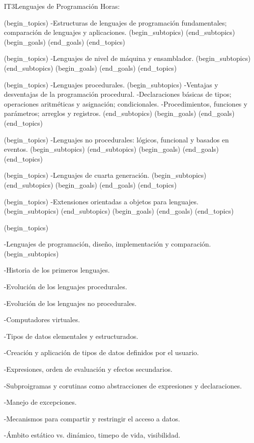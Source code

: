 \begin{BKL2}{IT3}{Lenguajes de Programación}
Horas:
 
(begin_topics)
-Estructuras de lenguajes de programación fundamentales; comparación de lenguajes y aplicaciones.
(begin_subtopics)
(end_subtopics)
(begin_goals)
(end_goals)
(end_topics)

 
(begin_topics)
-Lenguajes de nivel de máquina y ensamblador.
(begin_subtopics)
(end_subtopics)
(begin_goals)
(end_goals)
(end_topics)

 
(begin_topics)
-Lenguajes procedurales.
(begin_subtopics)
-Ventajas y desventajas de la programación procedural.
-Declaraciones básicas de tipos; operaciones aritméticas y asignación; condicionales.
-Procedimientos, funciones y parámetros; arreglos y registros.
(end_subtopics)
(begin_goals)
(end_goals)
(end_topics)

 
(begin_topics)
-Lenguajes no procedurales: lógicos, funcional y basados en eventos.
(begin_subtopics)
(end_subtopics)
(begin_goals)
(end_goals)
(end_topics)

 
(begin_topics)
-Lenguajes de cuarta generación.
(begin_subtopics)
(end_subtopics)
(begin_goals)
(end_goals)
(end_topics)

 

(begin_topics)
-Extensiones orientadas a objetos para lenguajes.
(begin_subtopics)
(end_subtopics)
(begin_goals)
(end_goals)
(end_topics)

 

(begin_topics)

-Lenguajes de programación, diseño, implementación y comparación.
(begin_subtopics)

-Historia de los primeros lenguajes.

-Evolución de los lenguajes procedurales.

-Evolución de los lenguajes no procedurales.

-Computadores virtuales.

-Tipos de datos elementales y estructurados.

-Creación y aplicación de tipos de datos definidos por el usuario.

-Expresiones, orden de evaluación y efectos secundarios.

-Subproigramas y corutinas como abstracciones de expresiones y declaraciones.

-Manejo de excepciones.

-Mecanismos para compartir y restringir el acceso a datos.

-Ámbito estático vs. dinámico, timepo de vida, visibilidad.


\end{BKL2}
